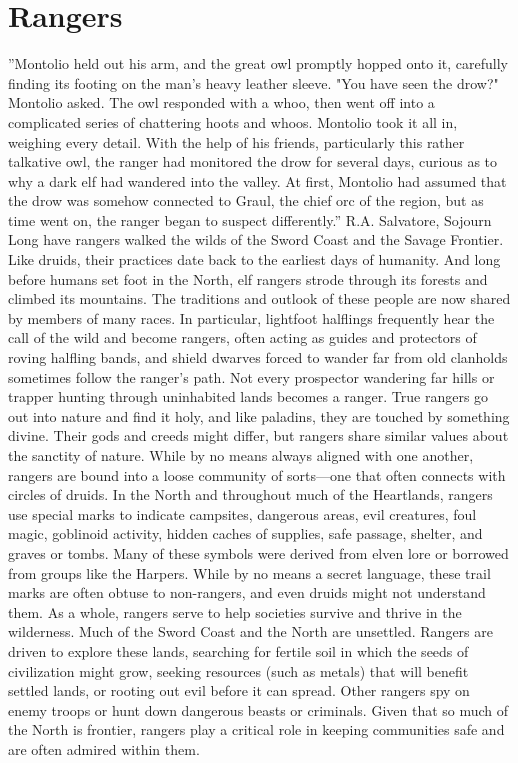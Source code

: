 \documentclass[10pt,a4paper,twoside,twocolumn,openany,bg=print,nodeprecatedcode]{dndbook}
\begin{document}
\section{Rangers}
\DndQuote%
{}
{''Montolio held out his arm, and the great owl promptly hopped onto it, carefully finding its footing on the man's heavy leather sleeve. "You have seen the drow?" Montolio asked. The owl responded with a whoo, then went off into a complicated series of chattering hoots and whoos. Montolio took it all in, weighing every detail. With the help of his friends, particularly this rather talkative owl, the ranger had monitored the drow for several days, curious as to why a dark elf had wandered into the valley. At first, Montolio had assumed that the drow was somehow connected to Graul, the chief orc of the region, but as time went on, the ranger began to suspect differently.''}
{R.A. Salvatore, Sojourn}
Long have rangers walked the wilds of the Sword Coast and the Savage Frontier. Like druids, their practices date back to the earliest days of humanity. And long before humans set foot in the North, elf rangers strode through its forests and climbed its mountains. The traditions and outlook of these people are now shared by members of many races. In particular, lightfoot halflings frequently hear the call of the wild and become rangers, often acting as guides and protectors of roving halfling bands, and shield dwarves forced to wander far from old clanholds sometimes follow the ranger's path.
Not every prospector wandering far hills or trapper hunting through uninhabited lands becomes a ranger. True rangers go out into nature and find it holy, and like paladins, they are touched by something divine. Their gods and creeds might differ, but rangers share similar values about the sanctity of nature. While by no means always aligned with one another, rangers are bound into a loose community of sorts—one that often connects with circles of druids.
In the North and throughout much of the Heartlands, rangers use special marks to indicate campsites, dangerous areas, evil creatures, foul magic, goblinoid activity, hidden caches of supplies, safe passage, shelter, and graves or tombs. Many of these symbols were derived from elven lore or borrowed from groups like the Harpers. While by no means a secret language, these trail marks are often obtuse to non-rangers, and even druids might not understand them.
As a whole, rangers serve to help societies survive and thrive in the wilderness. Much of the Sword Coast and the North are unsettled. Rangers are driven to explore these lands, searching for fertile soil in which the seeds of civilization might grow, seeking resources (such as metals) that will benefit settled lands, or rooting out evil before it can spread. Other rangers spy on enemy troops or hunt down dangerous beasts or criminals. Given that so much of the North is frontier, rangers play a critical role in keeping communities safe and are often admired within them.
\end{document}
